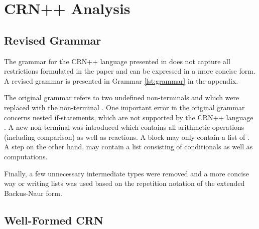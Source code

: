 \section{CRN++ Analysis}

\subsection{Revised Grammar} %
\setlength{\grammarparsep}{4pt plus 1pt minus 1pt} %
\setlength{\grammarindent}{10em} %

The grammar for the CRN++ language presented in \cite{soloveichik2018a} does not capture all restrictions formulated in the paper and can be expressed in a more concise form. A revised grammar is presented in Grammar \ref{lst:grammar} in the appendix.

The original grammar refers to two undefined non-terminals  and  which were replaced with the non-terminal . One important error in the original grammar concerns nested if-statements, which are not supported by the CRN++ language \cite{soloveichik2018a}. A new non-terminal  was introduced which contains all arithmetic operations (including comparison) as well as reactions. A  block may only contain a list of . A step on the other hand, may contain a list consisting of conditionals as well as computations.

Finally, a few unnecessary intermediate types were removed and a more concise way or writing lists was used based on the repetition notation of the extended Backus-Naur form.

\subsection{Well-Formed CRN} %
\label{sec:well-formed}

